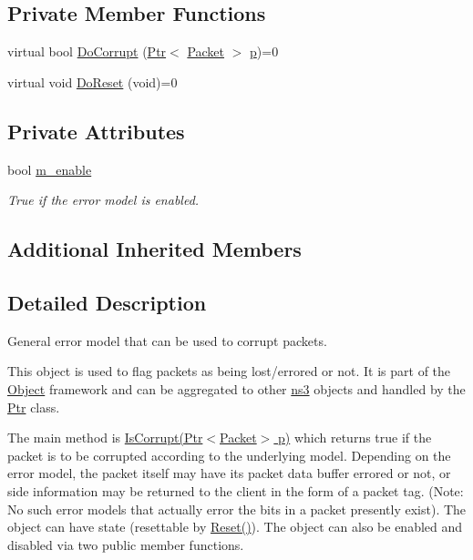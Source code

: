 \subsection*{Private Member Functions}
\begin{DoxyCompactItemize}
\item 
virtual bool \hyperlink{classns3_1_1ErrorModel_a7be074c59511ef72066d17a37036a0e0}{Do\+Corrupt} (\hyperlink{classns3_1_1Ptr}{Ptr}$<$ \hyperlink{classns3_1_1Packet}{Packet} $>$ \hyperlink{lte__link__budget__x2__handover__measures_8m_ac9de518908a968428863f829398a4e62}{p})=0
\item 
virtual void \hyperlink{classns3_1_1ErrorModel_ad7974020410bb8072c5b7e2a390e3030}{Do\+Reset} (void)=0
\end{DoxyCompactItemize}
\subsection*{Private Attributes}
\begin{DoxyCompactItemize}
\item 
bool \hyperlink{classns3_1_1ErrorModel_a29ca21de362215b31c727093ef547fe3}{m\+\_\+enable}
\begin{DoxyCompactList}\small\item\em True if the error model is enabled. \end{DoxyCompactList}\end{DoxyCompactItemize}
\subsection*{Additional Inherited Members}


\subsection{Detailed Description}
General error model that can be used to corrupt packets. 

This object is used to flag packets as being lost/errored or not. It is part of the \hyperlink{classns3_1_1Object}{Object} framework and can be aggregated to other \hyperlink{namespacens3}{ns3} objects and handled by the \hyperlink{classns3_1_1Ptr}{Ptr} class.

The main method is \hyperlink{classns3_1_1ErrorModel_af75222d384e342b46d0aed09d5e3a3fd}{Is\+Corrupt(\+Ptr$<$\+Packet$>$ p)} which returns true if the packet is to be corrupted according to the underlying model. Depending on the error model, the packet itself may have its packet data buffer errored or not, or side information may be returned to the client in the form of a packet tag. (Note\+: No such error models that actually error the bits in a packet presently exist). The object can have state (resettable by \hyperlink{classns3_1_1ErrorModel_a6b7cbe56c27562e5ba6daf2f04bcd282}{Reset()}). The object can also be enabled and disabled via two public member functions.


